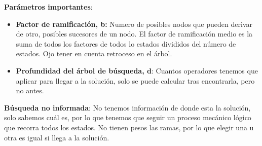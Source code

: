 \documentclass[12pt, twoside, openright]{report} %
\begin{document}
  \textbf{Parámetros importantes}:

  \begin{itemize}
  \item \textbf{Factor de ramificación, b:} Numero de posibles nodos que
    pueden derivar de otro, posibles sucesores de un nodo. El factor de
    ramificación medio es la suma de todos los factores de todos lo
    estados divididos del número de estados. Ojo tener en cuenta
    retroceso en el árbol.
    
  \item \textbf{Profundidad del árbol de búsqueda, d}: Cuantos operadores
    tenemos que aplicar para llegar a la solución, solo se puede
    calcular tras encontrarla, pero no antes.
    
  \end{itemize}

  \textbf{Búsqueda no informada}: No tenemos información de donde esta
  la solución, solo sabemos cuál es, por lo que tenemos que seguir un
  proceso mecánico lógico que recorra todos los estados. No tienen pesos
  las ramas, por lo que elegir una u otra es igual si llega a la
  solución.
\end{document}
